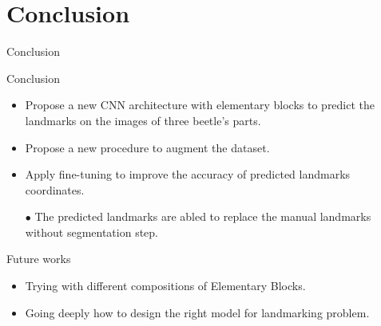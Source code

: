 \documentclass[10pt,svgnames]{beamer}
\begin{document}
\section{Conclusion}
\begin{frame}{Conclusion}
	\begin{block}{Conclusion}
		\small{
			\begin{itemize}
				\item Propose a new CNN architecture with elementary blocks to predict the landmarks on the images of three beetle's parts.
				\item Propose a new procedure to augment the dataset.
				\item Apply fine-tuning to improve the accuracy of predicted landmarks coordinates.
				\item[\textcolor{citem}{$\bullet$}] The predicted landmarks are abled to replace the manual landmarks without segmentation step.
			\end{itemize}
		}
	\end{block}
	\pause
	\begin{block}{Future works}
		\small{
			\begin{itemize}
				\item Trying with different compositions of Elementary Blocks.
				\item Going deeply how to design the right model for landmarking problem.
			\end{itemize}					
			}
	\end{block}
\end{frame}

{\1
\begin{frame}
\end{frame}}
\end{document}
